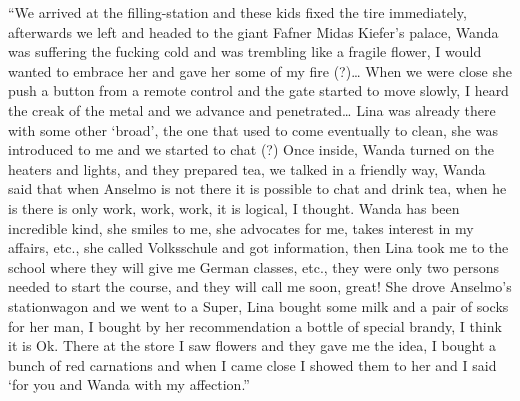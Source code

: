 \documentclass[smalldemyvopaper,11pt,twoside,onecolumn,openright,extrafontsizes]{memoir}
\begin{document}
“We arrived at the filling-station and these kids fixed the tire immediately, afterwards we left and headed to the giant Fafner Midas Kiefer’s palace, Wanda was suffering the fucking cold and was trembling like a fragile flower, I would wanted to embrace her and gave her some of my fire (?)… When we were close she push a button from a remote control and the gate started to move slowly, I heard the creak of the metal and we advance and penetrated… Lina was already there with some other ‘broad’, the one that used to come eventually to clean, she was introduced to me and we started to chat (?) Once inside, Wanda turned on the heaters and lights, and they prepared tea, we talked in a friendly way, Wanda said that when Anselmo is not there it is possible to chat and drink tea, when he is there is only work, work, work, it is logical, I thought. Wanda has been incredible kind, she smiles to me, she advocates for me, takes interest in my affairs, etc., she called Volksschule and got information, then Lina took me to the school where they will give me German classes, etc., they were only two persons needed to start the course, and they will call me soon, great! She drove Anselmo’s stationwagon  and we went to a Super, Lina bought some milk and a pair of socks for her man, I bought by her recommendation a bottle of special brandy, I think it is Ok. There at the store I saw flowers and they gave me the idea, I bought a bunch of red carnations and when I came close I showed them to her and I said ‘for you and Wanda with my affection.” 
\end{document}
